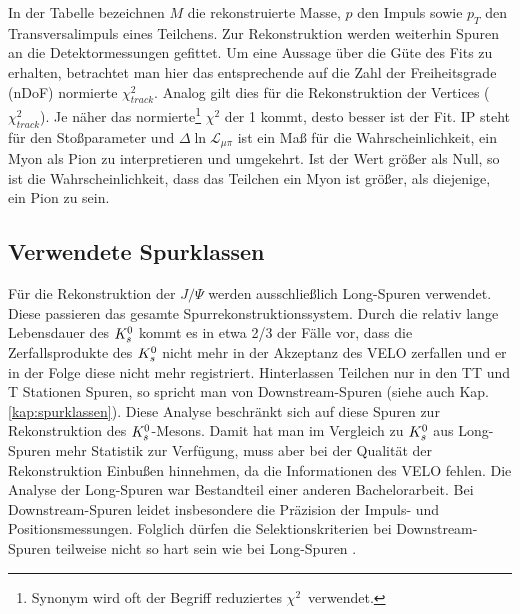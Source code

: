 In der Tabelle bezeichnen $M$ die rekonstruierte Masse, $p$ den Impuls sowie $p_T$ den Transversalimpuls eines Teilchens. Zur Rekonstruktion werden weiterhin Spuren an die Detektormessungen gefittet. Um eine Aussage über die Güte des Fits zu erhalten, betrachtet man hier das entsprechende auf die Zahl der Freiheitsgrade (nDoF) normierte $\chi_{track}^2$. Analog gilt dies für die Rekonstruktion der Vertices ($\chi_{track}^2$). Je näher das normierte\footnote{Synonym wird oft der Begriff \glqq reduziertes  $\chi^2$\grqq\ verwendet.} $\chi^2$ der 1 kommt, desto besser ist der Fit. IP steht für den Stoßparameter und $\Delta \ln \mathcal{L}_{\mu\pi}$ ist ein Maß für die Wahrscheinlichkeit, ein Myon als Pion zu interpretieren und umgekehrt. Ist der Wert größer als Null, so ist die Wahrscheinlichkeit, dass das Teilchen ein Myon ist größer, als diejenige, ein Pion zu sein.

\subsection{Verwendete Spurklassen} \label{kap:downstream}
Für die Rekonstruktion der $J/\Psi$ werden ausschließlich \glqq Long\grqq-Spuren verwendet. Diese passieren das gesamte Spurrekonstruktionssystem. Durch die relativ lange Lebensdauer des $K_s^0$ kommt es in etwa 2/3 der Fälle vor, dass die Zerfallsprodukte des $K_s^0$ nicht mehr in der Akzeptanz des VELO zerfallen und er in der Folge diese nicht mehr registriert. Hinterlassen Teilchen nur in den TT und T Stationen Spuren, so spricht man von \glqq Downstream\grqq-Spuren (siehe auch Kap. \ref{kap:spurklassen}). Diese Analyse beschränkt sich auf diese Spuren zur Rekonstruktion des $K_s^0$-Mesons. Damit hat man im Vergleich zu $K_s^0$ aus Long-Spuren mehr Statistik zur Verfügung, muss aber bei der Qualität der Rekonstruktion Einbußen hinnehmen, da die Informationen des VELO fehlen. Die Analyse der Long-Spuren war Bestandteil einer anderen Bachelorarbeit. Bei Downstream-Spuren leidet insbesondere die Präzision der Impuls- und Positionsmessungen. Folglich dürfen die Selektionskriterien bei Downstream-Spuren teilweise nicht so hart sein wie bei Long-Spuren \cite{lhcb-paper}.

